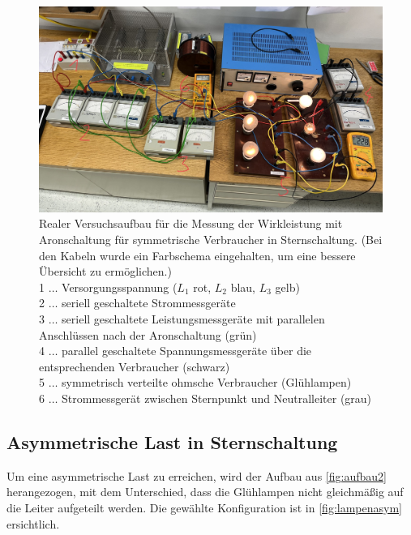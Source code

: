 \documentclass[12pt,english,ngerman]{scrartcl}
\begin{document}
\begin{figure}[H]
	\begin{center}
		\includegraphics[width = \textwidth]{./figures/aufbau2_echt.png}
	\end{center}
	\caption[Realer Versuchsaufbau für die Messung der Wirkleistung mit Aronschaltung für symmetrische
	Verbraucher in Sternschaltung]
	{Realer Versuchsaufbau für die Messung der Wirkleistung mit Aronschaltung für symmetrische
	Verbraucher in Sternschaltung. (Bei den Kabeln wurde ein Farbschema eingehalten, um eine bessere Übersicht zu ermöglichen.) \\
	1 \(\dots\) Versorgungsspannung ($L_1$ rot, $L_2$ blau, $L_3$ gelb) \\
	2 \(\dots\) seriell geschaltete Strommessgeräte  \\
	3 \(\dots\) seriell geschaltete Leistungsmessgeräte mit parallelen Anschlüssen nach der Aronschaltung (grün)\\
	4 \(\dots\) parallel geschaltete Spannungsmessgeräte über die entsprechenden Verbraucher (schwarz)\\
	5 \(\dots\) symmetrisch verteilte ohmsche Verbraucher (Glühlampen) \\
	6 \(\dots\) Strommessgerät zwischen Sternpunkt und Neutralleiter (grau)}\label{fig:aufbau2_echt}
\end{figure}


\subsection{Asymmetrische Last in Sternschaltung}

Um eine asymmetrische Last zu erreichen, wird der Aufbau aus \autoref{fig:aufbau2} herangezogen, mit dem Unterschied, 
dass die Glühlampen nicht gleichmäßig auf die Leiter aufgeteilt werden. Die gewählte Konfiguration ist in \autoref{fig:lampenasym} ersichtlich.
\end{document}
